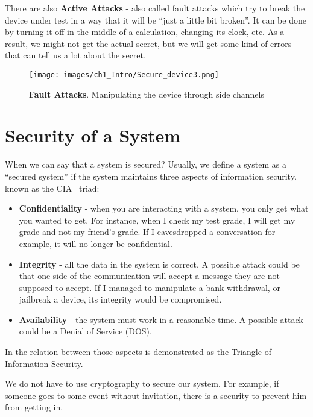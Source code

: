 There are also \textbf{Active Attacks} - also called fault attacks which try to
break the device under test in a way that it will be ``just a little bit broken''.
It can be done by turning it off in the middle of a calculation, changing its clock, etc. 
As a result, we might not get the actual secret, but we will get some kind of errors that can tell us a lot about the secret. 

\begin{figure}[!ht]
    \centering
    \texttt{[image: images/ch1\_Intro/Secure\_device3.png]}
    \caption{\textbf{Fault Attacks}. Manipulating the device through side channels}
    \label{fig:SecDev3}
\end{figure}

\section{Security of a System} \label{sec:SystemSecurity}

When we can say that a system is secured? Usually, we define a system as a
``secured system'' if the system maintains three aspects of information security,
known as the CIA~\cite{cia} triad:

\begin{itemize}
    \item \textbf{Confidentiality} - when you are interacting with a system, you
    only get what you wanted to get. For instance, when I check my test grade,
    I will get my grade and not my friend's grade. If I eavesdropped a conversation for example, it will no longer be confidential.
    \item \textbf{Integrity} - all the data in the system is correct. A possible
    attack could be that one side of the communication will accept a message
    they are not supposed to accept. If I managed to manipulate a bank withdrawal, or jailbreak a device, its integrity would be compromised.
    \item \textbf{Availability} - the system must work in a reasonable time. A
    possible attack could be a Denial of Service (DOS).
\end{itemize}

In  the relation between those aspects is demonstrated as the
Triangle of Information Security.

We do not have to use cryptography to secure our system. For example, if someone
goes to some event without invitation, there is a security to prevent him from
getting in.


